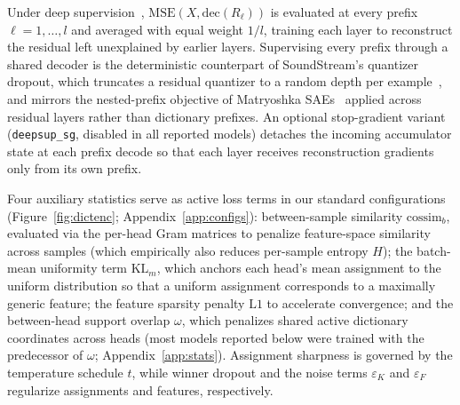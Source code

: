 

Under deep supervision~\cite{lee2015deeply},
$\mathrm{MSE}(X, \mathrm{dec}(R_\ell))$ is evaluated at every prefix
$\ell = 1, \dots, l$ and averaged with equal weight $1/l$, training each
layer to reconstruct the residual left unexplained by earlier layers.
Supervising every prefix through a shared decoder is the deterministic
counterpart of SoundStream's quantizer dropout, which truncates a
residual quantizer to a random depth per example~\cite{zeghidour2021},
and mirrors the nested-prefix objective of Matryoshka
SAEs~\cite{bussmann2025} applied across residual layers rather than
dictionary prefixes. An optional stop-gradient variant
(\texttt{deepsup\_sg}, disabled in all reported models) detaches the
incoming accumulator state at each prefix decode so that each layer
receives reconstruction gradients only from its own prefix.

Four auxiliary statistics serve as active loss terms in our standard
configurations (Figure~\ref{fig:dictenc}; Appendix~\ref{app:configs}):
between-sample similarity $\mathrm{cossim}_b$, evaluated via the
per-head Gram matrices to penalize feature-space similarity across
samples (which empirically also reduces per-sample entropy $H$); the
batch-mean uniformity term $\mathrm{KL}_m$, which anchors each head's
mean assignment to the uniform distribution so that a uniform assignment
corresponds to a maximally generic feature; the feature sparsity penalty
$\mathrm{L1}$ to accelerate convergence; and the between-head support
overlap $\omega$, which penalizes shared active dictionary coordinates
across heads (most models reported below were trained with the
predecessor of $\omega$; Appendix~\ref{app:stats}). Assignment sharpness
is governed by the temperature schedule $t$, while winner dropout and the
noise terms $\varepsilon_K$ and $\varepsilon_F$ regularize assignments
and features, respectively.

